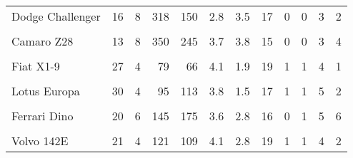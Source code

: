 \documentclass{article}
\begin{document}
\begin{table}
\begin{tabular}{lrrrrrrrrrrr}
Dodge Challenger & 16 & 8 & 318 & 150 & 2.8 & 3.5 & 17 & 0 & 0 & 3 & 2\\
\cellcolor{blue!10}{AMC Javelin} & \cellcolor{blue!10}{15} & \cellcolor{blue!10}{8} & \cellcolor{blue!10}{304} & \cellcolor{blue!10}{150} & \cellcolor{blue!10}{3.1} & \cellcolor{blue!10}{3.4} & \cellcolor{blue!10}{17} & \cellcolor{blue!10}{0} & \cellcolor{blue!10}{0} & \cellcolor{blue!10}{3} & \cellcolor{blue!10}{2}\\
Camaro Z28 & 13 & 8 & 350 & 245 & 3.7 & 3.8 & 15 & 0 & 0 & 3 & 4\\
\cellcolor{blue!10}{Pontiac Firebird} & \cellcolor{blue!10}{19} & \cellcolor{blue!10}{8} & \cellcolor{blue!10}{400} & \cellcolor{blue!10}{175} & \cellcolor{blue!10}{3.1} & \cellcolor{blue!10}{3.9} & \cellcolor{blue!10}{17} & \cellcolor{blue!10}{0} & \cellcolor{blue!10}{0} & \cellcolor{blue!10}{3} & \cellcolor{blue!10}{2}\\
\addlinespace
Fiat X1-9 & 27 & 4 & 79 & 66 & 4.1 & 1.9 & 19 & 1 & 1 & 4 & 1\\
\cellcolor{blue!10}{Porsche 914-2} & \cellcolor{blue!10}{26} & \cellcolor{blue!10}{4} & \cellcolor{blue!10}{120} & \cellcolor{blue!10}{91} & \cellcolor{blue!10}{4.4} & \cellcolor{blue!10}{2.1} & \cellcolor{blue!10}{17} & \cellcolor{blue!10}{0} & \cellcolor{blue!10}{1} & \cellcolor{blue!10}{5} & \cellcolor{blue!10}{2}\\
Lotus Europa & 30 & 4 & 95 & 113 & 3.8 & 1.5 & 17 & 1 & 1 & 5 & 2\\
\cellcolor{blue!10}{Ford Pantera L} & \cellcolor{blue!10}{16} & \cellcolor{blue!10}{8} & \cellcolor{blue!10}{351} & \cellcolor{blue!10}{264} & \cellcolor{blue!10}{4.2} & \cellcolor{blue!10}{3.2} & \cellcolor{blue!10}{14} & \cellcolor{blue!10}{0} & \cellcolor{blue!10}{1} & \cellcolor{blue!10}{5} & \cellcolor{blue!10}{4}\\
Ferrari Dino & 20 & 6 & 145 & 175 & 3.6 & 2.8 & 16 & 0 & 1 & 5 & 6\\
\addlinespace
\cellcolor{blue!10}{Maserati Bora} & \cellcolor{blue!10}{15} & \cellcolor{blue!10}{8} & \cellcolor{blue!10}{301} & \cellcolor{blue!10}{335} & \cellcolor{blue!10}{3.5} & \cellcolor{blue!10}{3.6} & \cellcolor{blue!10}{15} & \cellcolor{blue!10}{0} & \cellcolor{blue!10}{1} & \cellcolor{blue!10}{5} & \cellcolor{blue!10}{8}\\
Volvo 142E & 21 & 4 & 121 & 109 & 4.1 & 2.8 & 19 & 1 & 1 & 4 & 2\\
\bottomrule
\end{tabular}
\end{table}
\end{document}
